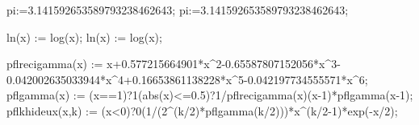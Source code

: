 
\newcommand\tkzgrphSetKVboolFalse[3][]{%
  \ifboolKV[#1]{#2}{\setKV[#1]{#3=true}}{}%
}

\newcommand\tkzgrphSetKVboolTrue[3][]{%
  \ifboolKV[#1]{#2}{}{\setKV[#1]{#3=false}}%
}

\xintdefvar pi:=3.141592653589793238462643;
\xintdeffloatvar pi:=3.141592653589793238462643;

\xintdeffunc ln(x) := log(x);
\xintdeffloatfunc ln(x) := log(x);

\xintdeffloatfunc pflrecigamma(x) := x+0.577215664901*x^2-0.65587807152056*x^3-0.042002635033944*x^4+0.16653861138228*x^5-0.042197734555571*x^6;
\xintdeffloatfunc pflgamma(x) := (x==1)?{1}{(abs(x)<=0.5)?{1/pflrecigamma(x)}{(x-1)*pflgamma(x-1)}};
\xintdeffloatfunc pflkhideux(x,k) := (x<0)?{0}{(1/(2^(k/2)*pflgamma(k/2)))*x^(k/2-1)*exp(-x/2)};

\NewDocumentCommand{}

\NewDocumentCommand{}

\NewDocumentCommand{}

\NewDocumentCommand{}

\NewDocumentCommand{}

